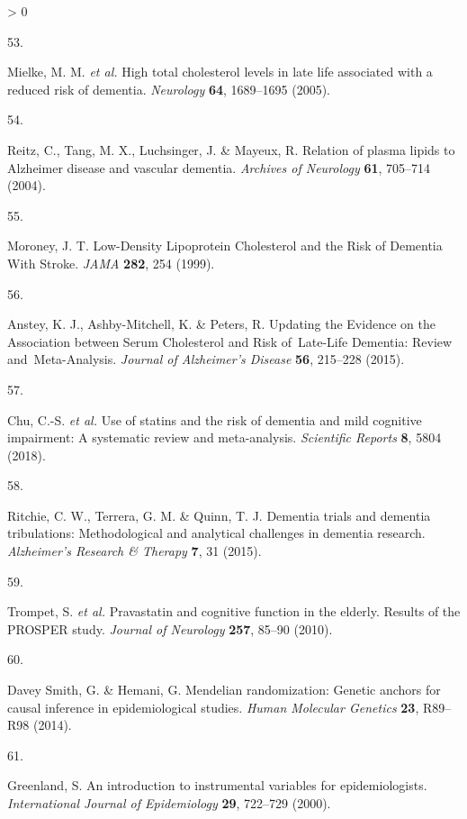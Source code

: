 \documentclass[a4paper, twoside]{templates/ociamthesis}
\newlength{\cslhangindent}
\newlength{\csllabelwidth}
\newenvironment{CSLReferences}[3] %
 {%
  \setlength{\parindent}{0pt}
  \ifodd #1 \everypar{\setlength{\hangindent}{\cslhangindent}}\ignorespaces\fi
  \ifnum #2 > 0
  \setlength{\parskip}{#2\baselineskip}
  \fi
 }%
 {}
\newcommand{\CSLLeftMargin}[1]{\parbox[t]{\maxof{\widthof{#1}}{\csllabelwidth}}{#1}}
\newcommand{\CSLRightInline}[1]{\parbox[t]{\linewidth - \csllabelwidth}{#1}}
\begin{document}
\begin{CSLReferences}{0}{0}
\leavevmode\hypertarget{ref-mielke2005}{}%
\CSLLeftMargin{53. }
\CSLRightInline{Mielke, M. M. \emph{et al.} High total cholesterol levels in late life associated with a reduced risk of dementia. \emph{Neurology} \textbf{64}, 1689--1695 (2005).}

\leavevmode\hypertarget{ref-reitz2004a}{}%
\CSLLeftMargin{54. }
\CSLRightInline{Reitz, C., Tang, M. X., Luchsinger, J. \& Mayeux, R. Relation of plasma lipids to {Alzheimer} disease and vascular dementia. \emph{Archives of Neurology} \textbf{61}, 705--714 (2004).}

\leavevmode\hypertarget{ref-moroney1999}{}%
\CSLLeftMargin{55. }
\CSLRightInline{Moroney, J. T. Low-{Density Lipoprotein Cholesterol} and the {Risk} of {Dementia With Stroke}. \emph{JAMA} \textbf{282}, 254 (1999).}

\leavevmode\hypertarget{ref-anstey2015}{}%
\CSLLeftMargin{56. }
\CSLRightInline{Anstey, K. J., Ashby-Mitchell, K. \& Peters, R. Updating the {Evidence} on the {Association} between {Serum Cholesterol} and {Risk} of~{Late}-{Life Dementia}: {Review} and~{Meta}-{Analysis}. \emph{Journal of Alzheimer's Disease} \textbf{56}, 215--228 (2015).}

\leavevmode\hypertarget{ref-chu2018}{}%
\CSLLeftMargin{57. }
\CSLRightInline{Chu, C.-S. \emph{et al.} Use of statins and the risk of dementia and mild cognitive impairment: {A} systematic review and meta-analysis. \emph{Scientific Reports} \textbf{8}, 5804 (2018).}

\leavevmode\hypertarget{ref-ritchie2015}{}%
\CSLLeftMargin{58. }
\CSLRightInline{Ritchie, C. W., Terrera, G. M. \& Quinn, T. J. Dementia trials and dementia tribulations: Methodological and analytical challenges in dementia research. \emph{Alzheimer's Research \& Therapy} \textbf{7}, 31 (2015).}

\leavevmode\hypertarget{ref-trompet2010}{}%
\CSLLeftMargin{59. }
\CSLRightInline{Trompet, S. \emph{et al.} Pravastatin and cognitive function in the elderly. {Results} of the {PROSPER} study. \emph{Journal of Neurology} \textbf{257}, 85--90 (2010).}

\leavevmode\hypertarget{ref-daveysmith2014}{}%
\CSLLeftMargin{60. }
\CSLRightInline{Davey Smith, G. \& Hemani, G. Mendelian randomization: Genetic anchors for causal inference in epidemiological studies. \emph{Human Molecular Genetics} \textbf{23}, R89--R98 (2014).}

\leavevmode\hypertarget{ref-greenland2000}{}%
\CSLLeftMargin{61. }
\CSLRightInline{Greenland, S. An introduction to instrumental variables for epidemiologists. \emph{International Journal of Epidemiology} \textbf{29}, 722--729 (2000).}


\end{CSLReferences}
\end{document}
